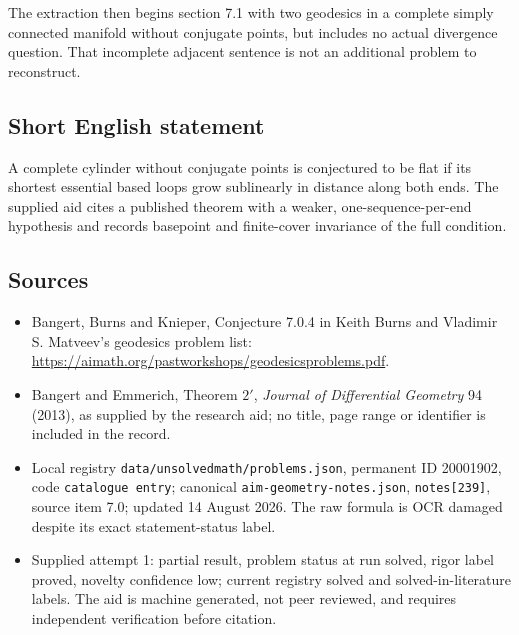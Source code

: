 \documentclass[11pt]{article}
\begin{document}
The extraction then begins section 7.1 with two geodesics in a complete simply connected manifold without conjugate points, but includes no actual divergence question. That incomplete adjacent sentence is not an additional problem to reconstruct.
\subsection{Short English statement}
A complete cylinder without conjugate points is conjectured to be flat if its shortest essential based loops grow sublinearly in distance along both ends. The supplied aid cites a published theorem with a weaker, one-sequence-per-end hypothesis and records basepoint and finite-cover invariance of the full condition.
\subsection{Sources}
\begin{itemize}
\item Bangert, Burns and Knieper, Conjecture 7.0.4 in Keith Burns and Vladimir S. Matveev's geodesics problem list: \url{https://aimath.org/pastworkshops/geodesicsproblems.pdf}.
\item Bangert and Emmerich, Theorem \(2'\), \emph{Journal of Differential Geometry} 94 (2013), as supplied by the research aid; no title, page range or identifier is included in the record.
\item Local registry \texttt{data/unsolvedmath/problems.json}, permanent ID 20001902, code \texttt{catalogue entry}; canonical \texttt{aim-geometry-notes.json}, \texttt{notes[239]}, source item 7.0; updated 14 August 2026. The raw formula is OCR damaged despite its exact statement-status label.
\item Supplied attempt 1: partial result, problem status at run solved, rigor label proved, novelty confidence low; current registry solved and solved-in-literature labels. The aid is machine generated, not peer reviewed, and requires independent verification before citation.
\end{itemize}
\end{document}
